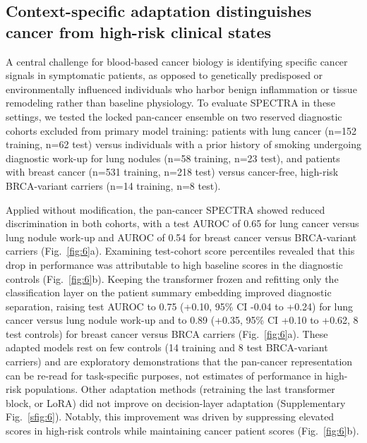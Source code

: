 \documentclass[11pt]{article}
\begin{document}
\subsection*{Context-specific adaptation distinguishes cancer from high-risk clinical states}

A central challenge for blood-based cancer biology is identifying specific cancer signals in symptomatic patients, as opposed to genetically predisposed or environmentally influenced individuals who harbor benign inflammation or tissue remodeling rather than baseline physiology. To evaluate SPECTRA in these settings, we tested the locked pan-cancer ensemble on two reserved diagnostic cohorts excluded from primary model training: patients with lung cancer (n=152 training, n=62 test) versus individuals with a prior history of smoking undergoing diagnostic work-up for lung nodules (n=58 training, n=23 test), and patients with breast cancer (n=531 training, n=218 test) versus cancer-free, high-risk BRCA-variant carriers (n=14 training, n=8 test).

Applied without modification, the pan-cancer SPECTRA showed reduced discrimination in both cohorts, with a test AUROC of 0.65 for lung cancer versus lung nodule work-up and AUROC of 0.54 for breast cancer versus BRCA-variant carriers (Fig.~\ref{fig:6}a). Examining test-cohort score percentiles revealed that this drop in performance was attributable to high baseline scores in the diagnostic controls (Fig.~\ref{fig:6}b). Keeping the transformer frozen and refitting only the classification layer on the patient summary embedding improved diagnostic separation, raising test AUROC to 0.75 (+0.10, 95\% CI -0.04 to +0.24) for lung cancer versus lung nodule work-up and to 0.89 (+0.35, 95\% CI +0.10 to +0.62, 8 test controls) for breast cancer versus BRCA carriers (Fig.~\ref{fig:6}a). These adapted models rest on few controls (14 training and 8 test BRCA-variant carriers) and are exploratory demonstrations that the pan-cancer representation can be re-read for task-specific purposes, not estimates of performance in high-risk populations. Other adaptation methods (retraining the last transformer block, or LoRA)\cite{hu2022} did not improve on decision-layer adaptation (Supplementary Fig.~\ref{sfig:6}). Notably, this improvement was driven by suppressing elevated scores in high-risk controls while maintaining cancer patient scores (Fig.~\ref{fig:6}b).
\end{document}
